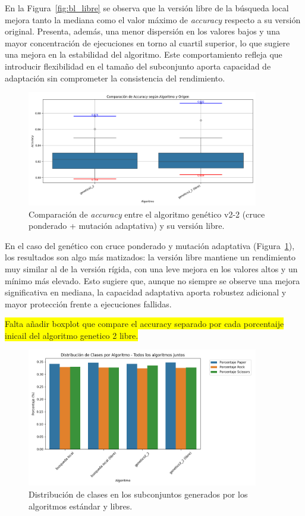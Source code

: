En la Figura~\ref{fig:bl_libre} se observa que la versión libre de la búsqueda local mejora tanto la mediana
como el valor máximo de \textit{accuracy} respecto a su versión original.
Presenta, además, una menor dispersión en los valores bajos y una mayor concentración de ejecuciones en torno al cuartil superior,
lo que sugiere una mejora en la estabilidad del algoritmo.
Este comportamiento refleja que introducir flexibilidad en el tamaño del subconjunto aporta capacidad de adaptación sin comprometer la consistencia del rendimiento.


\begin{figure}[htp]
    \centering
    \includegraphics[width=0.9\textwidth]{imagenes/evaluaciones/libres/comparacion_gen_v2}
    \caption{Comparación de \textit{accuracy} entre el algoritmo genético v2-2 (cruce ponderado + mutación adaptativa) y su versión libre.}
    \label{fig:gen_v2_libre}
\end{figure}

En el caso del genético con cruce ponderado y mutación adaptativa (Figura~\ref{fig:gen_v2_libre}),
los resultados son algo más matizados: la versión libre mantiene un rendimiento muy similar al de la versión rígida,
con una leve mejora en los valores altos y un mínimo más elevado.
Esto sugiere que, aunque no siempre se observe una mejora significativa en mediana,
la capacidad adaptativa aporta robustez adicional y mayor protección frente a ejecuciones fallidas.


\colorbox{yellow}{Falta añadir boxplot que compare el accuracy separado por cada porcentaije inicail del algoritmo genetico 2 libre.}


\begin{figure}[htp]
    \centering
    \includegraphics[width=0.9\textwidth]{imagenes/evaluaciones/libres/distribucion-clases}
    \caption{Distribución de clases en los subconjuntos generados por los algoritmos estándar y libres.}
    \label{fig:distribucion_libres}
\end{figure}

